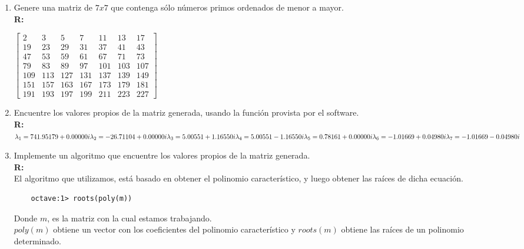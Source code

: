 \begin{enumerate}
	\item Genere una matriz de $7x7$ que contenga sólo números
	primos ordenados de menor a mayor.\\
	\textbf{R:}\\
\begin{center}
$
\begin{bmatrix}
     2 &    3 &    5 &    7 &   11 &   13 &   17\\ 
    19 &   23 &   29 &   31 &   37 &   41 &   43\\
    47 &   53 &   59 &   61 &   67 &   71 &   73\\
    79 &   83 &   89 &   97 &  101 &  103 &  107\\
   109 &  113 &  127 &  131 &  137 &  139 &  149\\
   151 &  157 &  163 &  167 &  173 &  179 &  181\\
   191 &  193 &  197 &  199 &  211 &  223 &  227
\end{bmatrix}
$
\end{center}
	\item Encuentre los valores propios de la matriz generada,
	 usando la función provista por el software.\\
	\textbf{R:}\\
$
\lambda_1 = 741.95179 + 0.00000i\\ 
\lambda_2 = -26.71104 + 0.00000i\\
\lambda_3 =   5.00551 + 1.16550i\\
\lambda_4 =   5.00551 - 1.16550i\\
\lambda_5 =   0.78161 + 0.00000i\\
\lambda_6 =  -1.01669 + 0.04980i\\
\lambda_7 =  -1.01669 - 0.04980i\\
$
	\item Implemente un algoritmo que encuentre los valores propios
	de la matriz generada.\\
	\textbf{R:}\\
	El algoritmo que utilizamos,
	está basado en obtener el polinomio característico,
	y luego obtener las raíces de dicha ecuación.\\
	\begin{verbatim}
	octave:1> roots(poly(m))
	\end{verbatim}
	Donde $m$, es la matriz con la cual estamos trabajando.\\
	$poly(m)$ obtiene un vector con los coeficientes del polinomio característico y
	$roots(m)$ obtiene las raíces de un polinomio determinado.
	

\end{enumerate}
